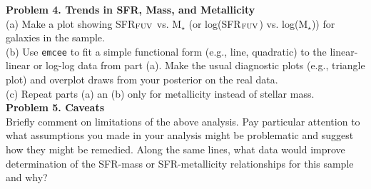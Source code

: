 \documentclass{article}
\begin{document}
\noindent \textbf{Problem 4. Trends in SFR, Mass, and Metallicity} \\

(a) Make a plot showing SFR$_{\rm FUV}$ vs. M$_{\star}$ (or log(SFR$_{\rm FUV}$) vs. log(M$_{\star}$)) for galaxies in the sample. \\

(b) Use \texttt{emcee} to fit a simple functional form (e.g., line, quadratic) to the linear-linear or log-log data from part (a).   Make the usual diagnostic plots (e.g., triangle plot) and overplot draws from your posterior on the real data. \\

(c) Repeat parts (a) an (b) only for metallicity instead of stellar mass. \\


\noindent \textbf{Problem 5. Caveats} \\

Briefly comment on limitations of the above analysis.  Pay particular attention to what assumptions you made in your analysis might be problematic and suggest how they might be remedied.  Along the same lines, what data would improve determination of the SFR-mass or SFR-metallicity relationships for this sample and why?
\end{document}
